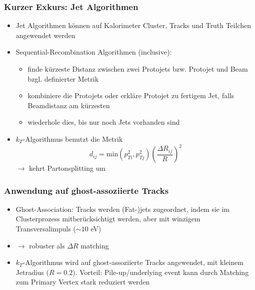 \documentclass{beamer}
\begin{document}
\begin{frame}
    \frametitle{Kurzer Exkurs: Jet Algorithmen}
    \begin{itemize}
        \item Jet Algorithmen können auf Kalorimeter Cluster, Tracks und Truth Teilchen angewendet werden
        \item Sequential-Recombination Algorithmen (inclusive):
        \begin{itemize}
            \item finde kürzeste Distanz zwischen zwei Protojets bzw. Protojet und Beam bzgl. definierter Metrik
            \item kombiniere die Protojets oder erkläre Protojet zu fertigem Jet, falls Beamdistanz am kürzesten
            \item wiederhole dies, bis nur noch Jets vorhanden sind
        \end{itemize}
        \item $k_T$-Algorithmus benutzt die Metrik
        \begin{equation}
            d_{ij} = \text{min}(p_{Ti}^2,p_{Tj}^2) \left(\frac{\Delta R_{ij}}{R}\right)^2
        \end{equation}
        $\rightarrow$ kehrt Partonsplitting um
    \end{itemize}
\end{frame}

\begin{frame}
    \frametitle{Anwendung auf ghost-assoziierte Tracks}
    \begin{itemize}
        \item Ghost-Association: Tracks werden (Fat-)jets zugeordnet, indem sie im Clusterprozess mitberücksichtigt werden, aber mit winzigem Transversalimpuls ($\sim 10$ eV)
        \item $\rightarrow$ robuster als $\Delta R$ matching
        \item $k_T$-Algorithmus wird auf ghost-assoziierte Tracks angewendet, mit kleinem Jetradius ($R = 0.2$). Vorteil: Pile-up/underlying event kann durch Matching zum Primary Vertex stark reduziert werden
    \end{itemize}
\end{frame}
\end{document}
